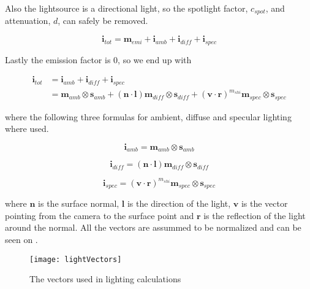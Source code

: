 Also the lightsource is a directional light, so the spotlight factor,
$c_{spot}$, and attenuation, $d$, can safely be removed.

\begin{displaymath}
  \mathbf{i}_{tot} = \mathbf{m}_{emi} + \mathbf{i}_{amb} + \mathbf{i}_{diff} + \mathbf{i}_{spec}
\end{displaymath}

Lastly the emission factor is 0, so we end up with

\begin{displaymath}
  \begin{array}{rl}
    \mathbf{i}_{tot} &= \mathbf{i}_{amb} + \mathbf{i}_{diff} +
    \mathbf{i}_{spec}\\
    &= \mathbf{m}_{amb} \otimes \mathbf{s}_{amb} + (\mathbf{n} \cdot
    \mathbf{l}) \mathbf{m}_{diff} \otimes \mathbf{s}_{diff} +
    (\mathbf{v} \cdot \mathbf{r})^{m_{shi}} \mathbf{m}_{spec} \otimes
    \mathbf{s}_{spec} 
  \end{array}
\end{displaymath}

where the following three formulas for ambient, diffuse and specular
lighting where used.

\begin{displaymath}
  \mathbf{i}_{amb} = \mathbf{m}_{amb} \otimes \mathbf{s}_{amb} 
\end{displaymath}

\begin{displaymath}
  \mathbf{i}_{diff} = (\mathbf{n} \cdot \mathbf{l}) \mathbf{m}_{diff} \otimes \mathbf{s}_{diff} 
\end{displaymath}

\begin{displaymath}
  \mathbf{i}_{spec} = (\mathbf{v} \cdot \mathbf{r})^{m_{shi}} \mathbf{m}_{spec} \otimes \mathbf{s}_{spec} 
\end{displaymath}

where $\mathbf{n}$ is the surface normal, $\mathbf{l}$ is the
direction of the light, $\mathbf{v}$ is the vector pointing from the
camera to the surface point and $\mathbf{r}$ is the reflection of the
light around the normal. All the vectors are assummed to be normalized
and can be seen on .

\begin{figure}
  \centering
  \label{fig:lightVectors}
  \texttt{[image: lightVectors]}
  \caption{The vectors used in lighting calculations}
\end{figure}

